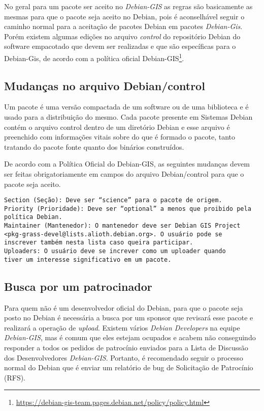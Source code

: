 No geral para um pacote ser aceito no \textit{Debian-GIS} as regras são basicamente as mesmas para que o pacote seja aceito no Debian, pois é aconselhável seguir o caminho normal para a aceitação de pacotes Debian em pacotes \textit{Debian-Gis}. Porém existem algumas edições no arquivo \textit{control} do repositório Debian do software empacotado que devem ser realizadas e que são específicas para o Debian-Gis, de acordo com a política oficial Debian-GIS\footnote{ \url{https://debian-gis-team.pages.debian.net/policy/policy.html}}.

\subsection{Mudanças no arquivo Debian/control}
Um pacote é uma versão compactada de um software ou de uma biblioteca e é usado para a distribuição do mesmo. Cada pacote presente em Sistemas Debian contém o arquivo control dentro de um diretório Debian e esse arquivo é preenchido com informações vitais sobre do que é formado o pacote, tanto tratando do pacote fonte quanto dos binários construídos.

De acordo com a Política Oficial do Debian-GIS, as seguintes mudanças devem ser feitas obrigatoriamente em campos do arquivo Debian/control para que o pacote seja aceito. 

\begin{verbatim}
Section (Seção): Deve ser “science” para o pacote de origem.
Priority (Prioridade): Deve ser “optional” a menos que proibido pela
política Debian.
Maintainer (Mantenedor): O mantenedor deve ser Debian GIS Project
<pkg-grass-devel@lists.alioth.debian.org>. O usuário pode se
inscrever também nesta lista caso queira participar.
Uploaders: O usuário deve se increver como um uploader quando
tiver um interesse significativo em um pacote.
\end{verbatim}

\subsection{Busca por um patrocinador}

Para quem não é um desenvolvedor oficial do Debian, para que o pacote seja posto no Debian é necessária a busca por um sponsor que revisará esse pacote e realizará a operação de \textit{upload}. Existem vários \textit{Debian Developers} na equipe \textit{Debian-GIS}, mas é comum que eles estejam ocupados e acabem não conseguindo responder a todos os pedidos de patrocínio enviados para a Lista de Discussão dos Desenvolvedores \textit{Debian-GIS}. Portanto, é recomendado seguir o processo normal do Debian que é enviar um relatório de bug de Solicitação de Patrocínio (RFS). 

